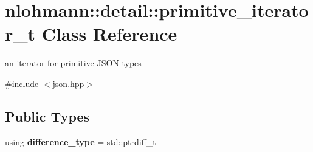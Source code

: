 \hypertarget{classnlohmann_1_1detail_1_1primitive__iterator__t}{}\section{nlohmann\+:\+:detail\+:\+:primitive\+\_\+iterator\+\_\+t Class Reference}
\label{classnlohmann_1_1detail_1_1primitive__iterator__t}


an iterator for primitive J\+S\+ON types  




{\ttfamily \#include $<$json.\+hpp$>$}

\subsection*{Public Types}
\begin{DoxyCompactItemize}
\item 
using {\bfseries difference\+\_\+type} = std\+::ptrdiff\+\_\+t\hypertarget{classnlohmann_1_1detail_1_1primitive__iterator__t_af3db0d5c90de427d51645fe73a015553}{}\label{classnlohmann_1_1detail_1_1primitive__iterator__t_af3db0d5c90de427d51645fe73a015553}

\end{DoxyCompactItemize}
